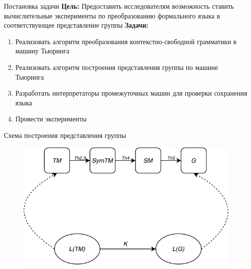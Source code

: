 \documentclass[xcolor=table]{beamer}
\begin{document}
\begin{frame}[fragile]{Постановка задачи}
\textbf{Цель:} Предоставить исследователям возможность ставить вычислительные эксперименты по преобразованию формального языка в соответствующее представление группы
\newline
\newline
\textbf{Задачи:}
    \begin{enumerate}
    \item Реализовать алгоритм преобразования контекстно-свободной грамматики в машину Тьюринга
    \item Реализовать алгоритм построения представления группы по машине Тьюринга
    \item Разработать интерпретаторы промежуточных машин для проверки сохранения языка
    \item Провести эксперименты
\end{enumerate}
\end{frame}

\begin{frame}[fragile]{Схема построения представления группы}
\begin{figure}[H]
  \centering
  \includegraphics[width=120mm]{pictures/2.pdf}
 \end{figure}
\end{frame}
\end{document}
